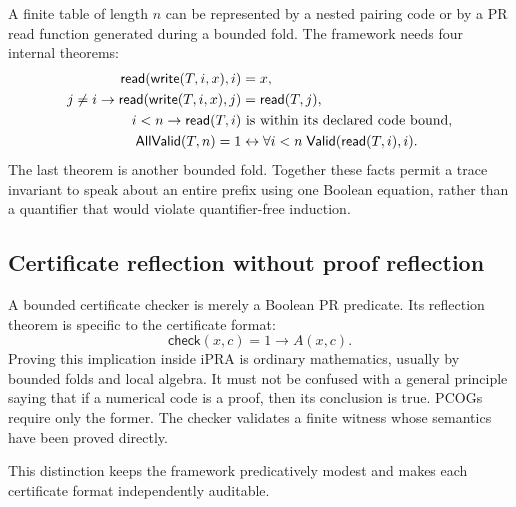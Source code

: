 A finite table of length \(n\) can be represented by a nested pairing code or
by a PR read function generated during a bounded fold.  The framework needs
four internal theorems:
\begin{align*}
 \mathsf{read}(\mathsf{write}(T,i,x),i)&=x,\\
 j\neq i\to
 \mathsf{read}(\mathsf{write}(T,i,x),j)&=\mathsf{read}(T,j),\\
 i<n\to \mathsf{read}(T,i)&\text{ is within its declared code bound},\\
 \mathsf{AllValid}(T,n)=1&\leftrightarrow
   \forall i<n\;\mathsf{Valid}(\mathsf{read}(T,i),i).
\end{align*}
The last theorem is another bounded fold.  Together these facts permit a
trace invariant to speak about an entire prefix using one Boolean equation,
rather than a quantifier that would violate quantifier-free induction.

\subsection{Certificate reflection without proof reflection}

A bounded certificate checker is merely a Boolean PR predicate.  Its
reflection theorem is specific to the certificate format:
\[
 \mathsf{check}(x,c)=1\longrightarrow A(x,c).
\]
Proving this implication inside iPRA is ordinary mathematics, usually by
bounded folds and local algebra.  It must not be confused with a general
principle saying that if a numerical code is a proof, then its conclusion is
true.  PCOGs require only the former.  The checker validates a finite witness
whose semantics have been proved directly.

This distinction keeps the framework predicatively modest and makes each
certificate format independently auditable.
